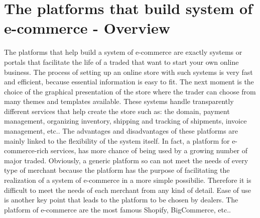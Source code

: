\section{The platforms that build system of e-commerce - Overview}
\label{sec:platform_overview}
The platforms that help build a system of e-commerce are exactly systems or portals that facilitate the life of a traded that want to start your own online business.
\newline
The process of setting up an online store with such systems is very fast and efficient, because essential information is easy to fit. The next moment is the choice of the graphical presentation of the store where the trader can choose from many themes and templates available.
These systems handle transparently different services that help create the store such as: the domain, payment management, organizing inventory, shipping and tracking of shipments, invoice management, etc..
\newline
The advantages and disadvantages of these platforms are mainly linked to the flexibility of the system itself. In fact, a platform for e-commerce-rich services, has more chance of being used by a growing number of major traded.
\newline
Obviously, a generic platform so can not meet the needs of every type of merchant because the platform has the purpose of facilitating the realization of a system of e-commerce in a more simple possibilie. Therefore it is difficult to meet the needs of each merchant from any kind of detail. Ease of use is another key point that leads to the platform to be chosen by dealers.
\newline
The platform of e-commerce are the most famous Shopify, BigCommerce, etc..
